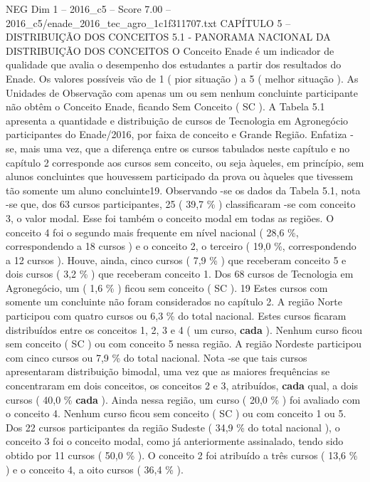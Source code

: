 \begin{textsample}{NEG Dim 1 – 2016\_c5 – Score 7.00 – 2016\_c5/enade\_2016\_tec\_agro\_1c1f311707.txt}  \label{ex:f1_neg_364}
CAPÍTULO 5 – DISTRIBUIÇÃO DOS CONCEITOS 5.1 - PANORAMA NACIONAL DA DISTRIBUIÇÃO DOS CONCEITOS O Conceito Enade é um indicador de qualidade que avalia o desempenho dos estudantes a partir dos resultados do Enade.
Os valores possíveis vão de 1 ( pior situação ) a 5 ( melhor situação ).
As Unidades de Observação com apenas um ou sem nenhum concluinte participante não obtêm o Conceito Enade, ficando Sem Conceito ( SC ).
A Tabela 5.1 apresenta a quantidade e distribuição de cursos de Tecnologia em Agronegócio participantes do Enade/2016, por faixa de conceito e Grande Região.
Enfatiza -se, mais uma vez, que a diferença entre os cursos tabulados neste capítulo e no capítulo 2 corresponde aos cursos sem conceito, ou seja àqueles, em princípio, sem alunos concluintes que houvessem participado da prova ou àqueles que tivessem tão somente um aluno concluinte19.
Observando -se os dados da Tabela 5.1, nota -se que, dos 63 cursos participantes, 25 ( 39,7 \% ) classificaram -se com conceito 3, o valor modal.
Esse foi também o conceito modal em todas as regiões.
O conceito 4 foi o segundo mais frequente em nível nacional ( 28,6 \%, correspondendo a 18 cursos ) e o conceito 2, o terceiro ( 19,0 \%, correspondendo a 12 cursos ).
Houve, ainda, cinco cursos ( 7,9 \% ) que receberam conceito 5 e dois cursos ( 3,2 \% ) que receberam conceito 1.
Dos 68 cursos de Tecnologia em Agronegócio, um ( 1,6 \% ) ficou sem conceito ( SC ). 19 Estes cursos com somente um concluinte não foram considerados no capítulo 2.
A região Norte participou com quatro cursos ou 6,3 \% do total nacional.
Estes cursos ficaram distribuídos entre os conceitos 1, 2, 3 e 4 ( um curso, \textbf{cada} ).
Nenhum curso ficou sem conceito ( SC ) ou com conceito 5 nessa região.
A região Nordeste participou com cinco cursos ou 7,9 \% do total nacional.
Nota -se que tais cursos apresentaram distribuição bimodal, uma vez que as maiores frequências se concentraram em dois conceitos, os conceitos 2 e 3, atribuídos, \textbf{cada} qual, a dois cursos ( 40,0 \% \textbf{cada} ).
Ainda nessa região, um curso ( 20,0 \% ) foi avaliado com o conceito 4.
Nenhum curso ficou sem conceito ( SC ) ou com conceito 1 ou 5.
Dos 22 cursos participantes da região Sudeste ( 34,9 \% do total nacional ), o conceito 3 foi o conceito modal, como já anteriormente assinalado, tendo sido obtido por 11 cursos ( 50,0 \% ).
O conceito 2 foi atribuído a três cursos ( 13,6 \% ) e o conceito 4, a oito cursos ( 36,4 \% ).

\end{textsample}
